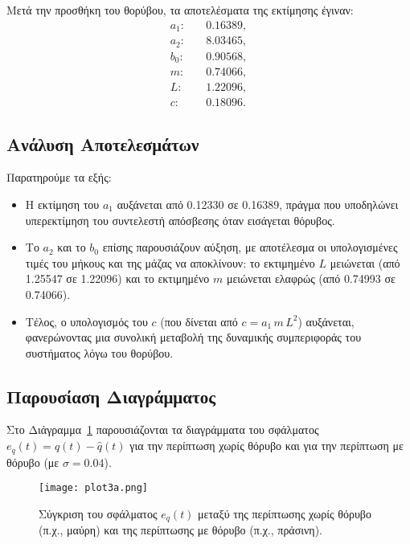 \documentclass[a4paper,12pt]{report}
\begin{document}
\vspace{0.3cm}

\hspace{-0.6cm}Μετά την προσθήκη του θορύβου, τα αποτελέσματα της εκτίμησης έγιναν:
\[
\begin{array}{ll}
a_{1}: & \quad 0.16389, \\[2ex]
a_{2}: & \quad 8.03465, \\[2ex]
b_{0}: & \quad 0.90568, \\[2ex]
m:     & \quad 0.74066, \\[2ex]
L:     & \quad 1.22096, \\[2ex]
c:     & \quad 0.18096.
\end{array}
\]

\subsection*{Ανάλυση Αποτελεσμάτων}

Παρατηρούμε τα εξής:
\begin{itemize}
    \item Η εκτίμηση του \(a_{1}\) αυξάνεται από 0.12330 σε 0.16389, πράγμα που υποδηλώνει υπερεκτίμηση του συντελεστή απόσβεσης όταν εισάγεται θόρυβος.
    \item Το \(a_{2}\) και το \(b_{0}\) επίσης παρουσιάζουν αύξηση, με αποτέλεσμα οι υπολογισμένες τιμές του μήκους και της μάζας να αποκλίνουν: το εκτιμημένο \(L\) μειώνεται (από 1.25547 σε 1.22096) και το εκτιμημένο \(m\) μειώνεται ελαφρώς (από 0.74993 σε 0.74066).
    \item Τέλος, ο υπολογισμός του \(c\) (που δίνεται από \(c = a_1 \,m\,L^2\)) αυξάνεται, φανερώνοντας μια συνολική μεταβολή της δυναμικής συμπεριφοράς του συστήματος λόγω του θορύβου.
\end{itemize}

\subsection*{Παρουσίαση Διαγράμματος}

Στο Διάγραμμα~\ref{fig:plot3a} παρουσιάζονται τα διαγράμματα του σφάλματος
\(e_q(t)=q(t)-\hat{q}(t)\) για την περίπτωση χωρίς θόρυβο και για την περίπτωση με θόρυβο (με \(\sigma=0.04\)). 

\begin{figure}[H]
    \centering
    \texttt{[image: plot3a.png]}
    \caption{Σύγκριση του σφάλματος \(e_q(t)\) μεταξύ της περίπτωσης χωρίς θόρυβο (π.χ., μαύρη) και της περίπτωσης με θόρυβο (π.χ., πράσινη).}
    \label{fig:plot3a}
\end{figure}
\end{document}
